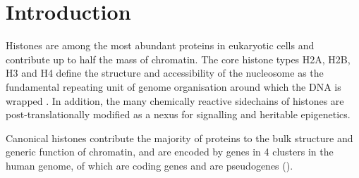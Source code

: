 \section{Introduction}

	Histones are among the most abundant proteins in eukaryotic cells 
	and contribute up to half the mass of chromatin. 
	The core histone types H2A, H2B, H3 and H4 
	define the structure and accessibility of the nucleosome 
	as the fundamental repeating unit of genome organisation 
	around which the DNA is wrapped \citep{Luger1997structure}.
	In addition, the many chemically reactive sidechains of histones 
	are post-translationally modified 
	as a nexus for signalling and heritable epigenetics.

	Canonical histones contribute the majority of proteins to 
	the bulk structure and generic function of chromatin, 
	and are encoded by \TotalGenes{} genes in 4 clusters in the human genome,
	of which \TotalCodingGenes{} are coding genes and \TotalPseudoGenes{} are pseudogenes ().

